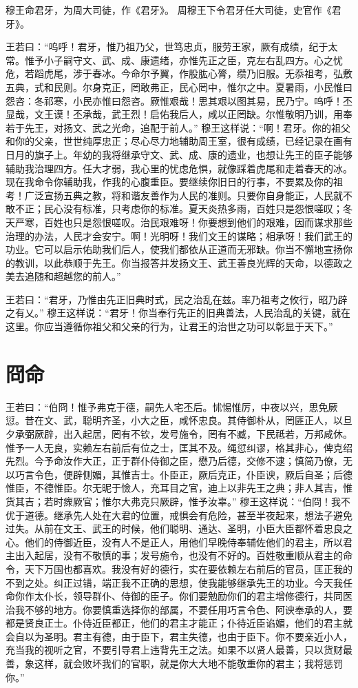 \documentclass[a4paper,12pt,UTF8,twoside]{ctexbook}
\begin{document}
穆王命君牙，为周大司徒，作《君牙》。
周穆王下令君牙任大司徒，史官作《君牙》。

王若曰：“呜呼！君牙，惟乃祖乃父，世笃忠贞，服劳王家，厥有成绩，纪于太常。惟予小子嗣守文、武、成、康遗绪，亦惟先正之臣，克左右乱四方。心之忧危，若蹈虎尾，涉于春冰。今命尔予翼，作股肱心膂，缵乃旧服。无忝祖考，弘敷五典，式和民则。尔身克正，罔敢弗正，民心罔中，惟尔之中。夏暑雨，小民惟曰怨咨：冬祁寒，小民亦惟曰怨咨。厥惟艰哉！思其艰以图其易，民乃宁。呜呼！丕显哉，文王谟！丕承哉，武王烈！启佑我后人，咸以正罔缺。尔惟敬明乃训，用奉若于先王，对扬文、武之光命，追配于前人。”
穆王这样说：“啊！君牙。你的祖父和你的父亲，世世纯厚忠正；尽心尽力地辅助周王室，很有成绩，已经记录在画有日月的旗子上。年幼的我将继承守文、武、成、康的遗业，也想让先王的臣子能够辅助我治理四方。任大才弱，我心里的忧虑危惧，就像踩着虎尾和走着春天的冰。现在我命令你辅助我，作我的心腹重臣。要继续你旧日的行事，不要累及你的祖考！广泛宣扬五典之教，将和谐友善作为人民的准则。只要你自身能正，人民就不敢不正；民心没有标准，只考虑你的标准。夏天炎热多雨，百姓只是怨恨嗟叹；冬天严寒，百姓也只是怨恨嗟叹。治民艰难呀！你要想到他们的艰难，因而谋求那些治理的办法，人民才会安宁。啊！光明呀！我们文王的谋略；相承呀！我们武王的功业。它可以启示佑助我们后人，使我们都依从正道而无邪缺。你当不懈地宣扬你的教训，以此恭顺于先王。你当报答并发扬文王、武王善良光辉的天命，以德政之美去追随和超越您的前人。”

王若曰：“君牙，乃惟由先正旧典时式，民之治乱在兹。率乃祖考之攸行，昭乃辟之有乂。”
穆王这样说：“君牙！你当奉行先正的旧典善法，人民治乱的关键，就在这里。你应当遵循你祖父和父亲的行为，让君王的治世之功可以彰显于天下。”

\chapter{冏命}

王若曰：“伯冏！惟予弗克于德，嗣先人宅丕后。怵惕惟厉，中夜以兴，思免厥愆。昔在文、武，聪明齐圣，小大之臣，咸怀忠良。其侍御朴从，罔匪正人，以旦夕承弼厥辟，出入起居，罔有不钦，发号施令，罔有不臧，下民祗若，万邦咸休。惟予一人无良，实赖左右前后有位之士，匡其不及。绳愆纠谬，格其非心，俾克绍先烈。今予命汝作大正，正于群仆侍御之臣，懋乃后德，交修不逮；慎简乃僚，无以巧言令色，便辟侧媚，其惟吉士。仆臣正，厥后克正，仆臣谀，厥后自圣；后德惟臣，不德惟臣。尔无昵于憸人，充耳目之官，迪上以非先王之典；非人其吉，惟货其吉；若时瘝厥官；惟尔大弗克只厥辟，惟予汝辜。”
穆王这样说：“伯冏！我不优于道德。继承先人处在大君的位置，戒惧会有危险，甚至半夜起来，想法子避免过失。从前在文王、武王的时候，他们聪明、通达、圣明，小臣大臣都怀着忠良之心。他们的侍御近臣，没有人不是正人，用他们早晚侍奉辅佐他们的君主，所以君主出入起居，没有不敬慎的事；发号施令，也没有不好的。百姓敬重顺从君主的命令，天下万国也都喜欢。我没有好的德行，实在要依赖左右前后的官员，匡正我的不到之处。纠正过错，端正我不正确的思想，使我能够继承先王的功业。今天我任命你作太仆长，领导群仆、侍御的臣子。你们要勉励你们的君主增修德行，共同医治我不够的地方。你要慎重选择你的部属，不要任用巧言令色、阿谀奉承的人，要都是贤良正士。仆侍近臣都正，他们的君主才能正；仆待近臣谄媚，他们的君主就会自以为圣明。君主有德，由于臣下，君主失德，也由于臣下。你不要亲近小人，充当我的视听之官，不要引导君上违背先王之法。如果不以贤人最善，只以货财最善，象这样，就会败坏我们的官职，就是你大大地不能敬重你的君主；我将惩罚你。”
\end{document}
